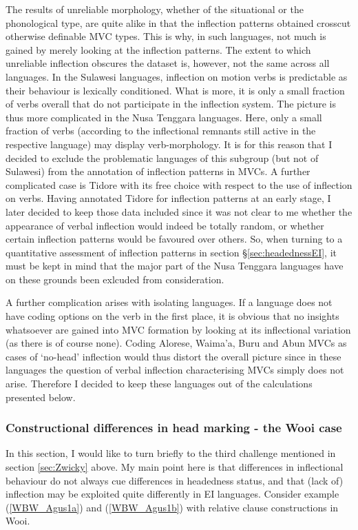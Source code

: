 The results of unreliable morphology, whether of the situational or the phonological type, are quite alike in that the inflection patterns obtained crosscut otherwise definable MVC types. This is why, in such languages, not much is gained by merely looking at the inflection patterns. The extent to which unreliable inflection obscures the dataset is, however, not the same across all languages. In the Sulawesi languages, inflection on motion verbs is predictable as their behaviour is lexically conditioned. What is more, it is only a small fraction of verbs overall that do not participate in the inflection system. The picture is thus more complicated in the Nusa Tenggara languages. Here, only a small fraction of verbs (according to the inflectional remnants still active in the respective language) may display verb-morphology. It is for this reason that I decided to exclude the problematic languages of this subgroup (but not of Sulawesi) from the annotation of inflection patterns in MVCs. A further complicated case is Tidore with its free choice with respect to the use of inflection on verbs. Having annotated Tidore for inflection patterns at an early stage, I later decided to keep those data included since it was not clear to me whether the appearance of verbal inflection would indeed be totally random, or whether certain inflection patterns would be favoured over others. So, when turning to a quantitative assessment of inflection patterns in section §\ref{sec:headednessEI}, it must be kept in mind that the major part of the Nusa Tenggara languages have on these grounds been exlcuded from consideration.

A further complication arises with isolating languages. If a language does not have coding options on the verb in the first place, it is obvious that no insights whatsoever are gained into MVC formation by looking at its inflectional variation (as there is of course none). Coding Alorese, Waima'a, Buru and Abun MVCs as cases of `no-head' inflection would thus distort the overall picture since in these languages the question of verbal inflection characterising MVCs simply does not arise. Therefore I decided to keep these languages out of the calculations presented below.

\subsubsection{Constructional differences in head marking - the Wooi case}\label{sec:wooicase}

In this section, I would like to turn briefly to the third challenge mentioned in section \ref{sec:Zwicky} above. My main point here is that differences in inflectional behaviour do not always cue differences in headedness status, and that (lack of) inflection may be exploited quite differently in EI languages. Consider example (\ref{WBW_Agus1a}) and (\ref{WBW_Agus1b}) with relative clause constructions in Wooi.


